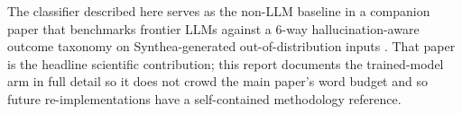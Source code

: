 The classifier described here serves as the non-LLM baseline in a
companion paper that benchmarks frontier LLMs against a 6-way
hallucination-aware outcome taxonomy on Synthea-generated
out-of-distribution inputs \autocite{FungPhantomCodes2026}. That paper is
the headline scientific contribution; this report documents the
trained-model arm in full detail so it does not crowd the main
paper's word budget and so future re-implementations have a
self-contained methodology reference.
